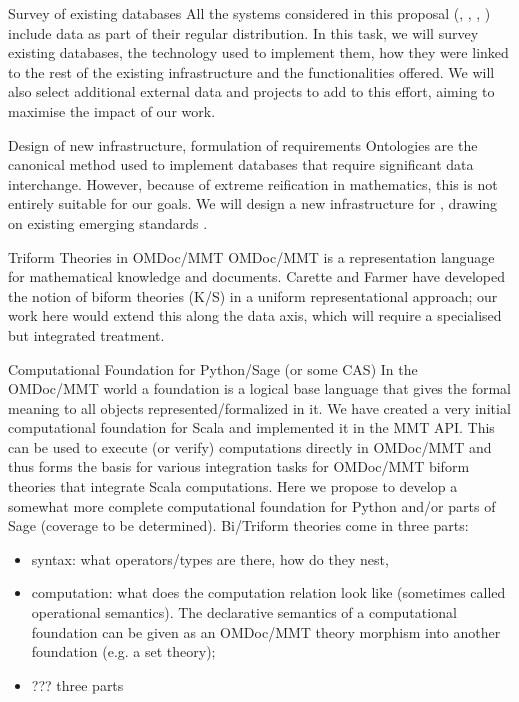 \begin{Workpackage}{\thewpno}
\begin{WPDescription}
\end{WPDescription}

\begin{task}{Survey of existing databases}
\label{task:data_assessment}
All the systems considered in this proposal (\GAP, \Sage, \Pari, \Singular) include data as part of their regular distribution. In this task, we will survey existing databases, the technology used to implement them, how they were linked to the rest of the existing infrastructure and the functionalities offered. We will also select additional external data and projects to add to this effort, aiming to maximise the impact of our work. 
\end{task}

\begin{task}{Design of new infrastructure, formulation of requirements}
\label{task:data_design}
Ontologies are the canonical method used to implement databases that require significant data interchange. However, because of extreme reification in mathematics, this is not entirely suitable for our goals. We will design a new infrastructure for \TheProject, drawing on existing emerging standards . 
\end{task}

\begin{task}{Triform Theories in OMDoc/MMT}
\label{task:data_triform}
OMDoc/MMT is a representation language for mathematical knowledge and documents. Carette and Farmer have developed the notion of biform theories (K/S) in a uniform representational approach; our work here would extend this along the data axis, which will require a specialised but integrated treatment.
\end{task}

\begin{task}{Computational Foundation for Python/Sage (or some CAS)}
\label{task:data_foundationCAS}
In the OMDoc/MMT world a foundation is a logical base language that gives the formal meaning to all objects represented/formalized in it. We have created a very initial computational foundation for Scala and implemented it in the MMT API. This can be used to execute (or verify) computations directly in OMDoc/MMT and thus forms the basis for various integration tasks for OMDoc/MMT biform theories that integrate Scala computations. Here we propose to develop a somewhat more complete computational foundation for Python and/or parts of Sage (coverage to be determined). Bi/Triform theories come in three parts:
\begin{itemize}
\item syntax: what operators/types are there, how do they nest, 
\item computation:  what does the computation relation look like (sometimes called operational semantics). The declarative semantics of a computational foundation can be given as an OMDoc/MMT theory morphism into another foundation (e.g. a set theory);
\item ??? three parts
\end{itemize}
\end{task}



\end{Workpackage}

